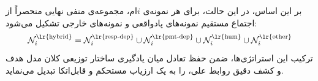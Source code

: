 بر این اساس، در این حالت، برای هر نمونه‌ی $i$ام، مجموعه‌ی منفی نهایی منحصراً از اجتماع مستقیم نمونه‌های پادواقعی و نمونه‌های خارجی تشکیل می‌شود:
\begin{equation}
    \mathcal{N}^{\text{\lr{hybrid}}}_i = \mathcal{N}^{\text{\lr{resp-dep}}}_i \cup \mathcal{N}^{\text{\lr{pmt-dep}}}_i \cup \mathcal{N}^{\text{\lr{hum}}}_i \cup \mathcal{N}^{\text{\lr{other}}}_i
\end{equation}
ترکیب این استراتژی‌ها، ضمن حفظ تعادل میان یادگیری ساختار توزیعی کلان مدل هدف و کشف دقیق روابط علی،  را به یک ارزیاب مستحکم و قابل‌اتکا تبدیل می‌نماید.
